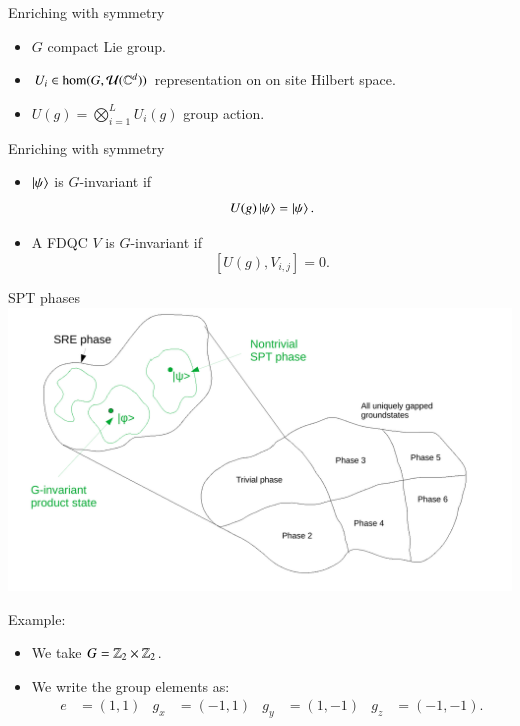 \documentclass{beamer}
\begin{document}
\begin{frame}{Enriching with symmetry}
	\begin{center}
		\scalebox{0.75}{
		
		}
	\end{center}
	\begin{itemize}
		\item $G$ compact Lie group.
		\item $U_i\in\hom(G,\mathcal{U}(\mathbb{C}^d))$ representation on on site Hilbert space.
		\item $U(g)=\bigotimes_{i=1}^{L}U_i(g)$ group action.
	\end{itemize}
\end{frame}

\begin{frame}{Enriching with symmetry}
	\begin{itemize}
		\item $\ket{\psi}$ is $G$-invariant if
		\[U(g)\ket{\psi}=\ket{\psi}.\]
		\item A FDQC $V$ is $G$-invariant if
		\[[U(g),V_{i,j}]=0.\]
	\end{itemize}
\end{frame}

\begin{frame}{SPT phases}
	\includegraphics[width=\textwidth]{Figures/SPT_Phases.pdf}
\end{frame}

\begin{frame}{Example:}
	\begin{itemize}
		\item We take $G=\mathbb{Z}_2\times\mathbb{Z}_2$.
		\item We write the group elements as:
		\begin{align*}
			e&=(1,1)&g_x&=(-1,1)&g_y&=(1,-1)&g_z&=(-1,-1).
		\end{align*}
	\end{itemize}
	
\end{frame}
\end{document}
